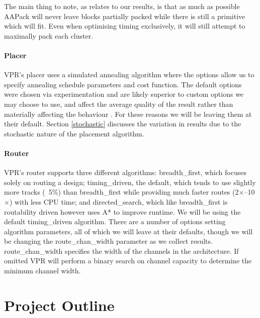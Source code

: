 \documentclass[12pt,final,oneside]{dwThesis} %
\begin{document}
   The main thing to
   note, as relates to our results, is that as much as possible AAPack will
   never leave blocks partially packed while there is still a primitive
   which will fit. Even when optimising timing exclusively, it will still
   attempt to maximally pack each cluster.

   \subsubsection{Placer} \gls{VPR}'s placer uses a simulated annealing
   algorithm where the options allow us to specify annealing schedule
   parameters and cost function. The default options were chosen via
   experimentation and are likely superior to custom options we may choose to
   use, and affect the average quality of the result rather than materially
   affecting the behaviour \cite{VPRManual, VPRBook}. For these reasons we will
   be leaving them at their default. Section \ref{stochastic} discusses the
   variation in results due to the stochastic nature of the placement
   algorithm.
   \subsubsection{Router} \gls{VPR}'s router supports three
   different algorithms: breadth\_first, which
   focuses solely on routing a design; timing\_driven, the default, which tends
   to use slightly more tracks (~5\%) than breadth\_first while providing much
   faster routes (2$\times$--10$\times$) with less CPU time; and
   directed\_search, which like breadth\_first is routability driven however
   uses A* to improve runtime. We will be using the default timing\_driven
   algorithm. There are a number of options setting
   algorithm parameters, all of which we will leave at their defaults, though
   we will be changing the route\_chan\_width parameter as we collect results.
   route\_chan\_width specifies the width of the channels in the architecture.
   If omitted \gls{VPR} will perform a binary search on channel capacity to
   determine the minimum channel width.


   \chapter{Project Outline}
\end{document}
